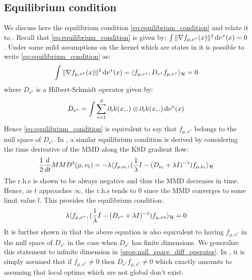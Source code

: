 \subsection{Equilibrium condition}\label{subsec:equilibrium_condition}
We discuss here the equilibrium condition \cref{eq:equilibrium_condition} and relate it to \cite[Assumption A]{Mroueh:2019}. Recall that \cref{eq:equilibrium_condition} is given by: $
\int \Vert \nabla f_{\mu,\nu^{*}}(x) \Vert^2 \mathop{}\!\mathrm{d} \nu^{*}(x) = 0$. Under some mild  assumptions on the kernel which are states in \cite[Appendix C.1]{Mroueh:2019} it is possible to write \cref{eq:equilibrium_condition} as:
\[
\int \Vert \nabla f_{\mu,\nu^{*}}(x) \Vert^2 \mathop{}\!\mathrm{d} \nu^{*}(x) = \langle f_{\mu,\nu^{*}} ,   D_{\nu^{*}}  f_{\mu,\nu^{*}}\rangle_{{{\mathcal H}}}  = 0
\]
where $D_{\nu^{*}}$ is a Hilbert-Schmidt operator given by: %
\[
D_{\nu^{*}} = \int \sum_{i=1}^d \partial_i k(x,.)\otimes \partial_i k(x,.) \mathop{}\!\mathrm{d} \nu^{*}(x)
\]
Hence \cref{eq:equilibrium_condition} is equivalent to say that $f_{\mu,\nu^{*}}$ belongs to the null space of $D_{\nu^{*}}$. In \cite[Theorem 2]{Mroueh:2019}, a similar equilibrium condition is derived by considering the time derivative of the MMD along the KSD gradient flow:
\[
\frac{1}{2} \frac{d}{dt} MMD^2(\mu,\nu_t) = - \lambda \langle f_{\mu,\nu_t}, (\frac{1}{\lambda}I - (D_{\nu_t} +\lambda I )^{-1})f_{\mu,\nu_t} \rangle_{{{\mathcal H}}} 
\] 
The r.h.s is shown to be always negative and thus the MMD decreases in time. Hence, as $t$ approaches $\infty$, the r.h.s tends to $0$ since the MMD converges to some limit value $l$. This provides the equilibrium condition:
\[
\lambda \langle f_{\mu,\nu^{*}}, (\frac{1}{\lambda}I - (D_{\nu^{*}} +\lambda I )^{-1})f_{\mu,\nu{*}} \rangle_{{{\mathcal H}}} = 0
\] 
It is further shown in  \cite[Lemma 2]{Mroueh:2019} that the above equation is also equivalent to having $f_{\mu,\nu^{*}}$ in the null space of $D_{\nu^{*}}$ in the case when $D_{\nu^{*}}$ has finite dimensions. We generalize this statement to infinite dimension in \cref{prop:null_space_diff_operator}. 
In \cite[Assumption A]{Mroueh:2019}, it is simply assumed that if $f_{\mu,\nu^{*}} \neq0$ then  $D_{\nu^{*}} f_{\mu,\nu^{*}} \neq 0 $ which exactly amounts to assuming that local optima which are not global don't exist.
 
